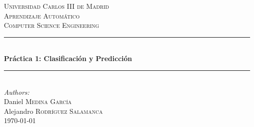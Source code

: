 \documentclass[12pt]{article}
\begin{document}
\begin{titlepage}

\newcommand{\HRule}{\rule{\linewidth}{0.5mm}} %

\center %


\textsc{\LARGE Universidad Carlos III de Madrid}\\[1.5cm] %
\textsc{\Large Aprendizaje Automático}\\[0.5cm] %
\textsc{\large Computer Science Engineering}\\[0.5cm] %


\HRule \\[0.4cm]
{ \huge \bfseries Práctica 1: Clasificación y Predicción}\\[0.4cm] %
\HRule \\[1.5cm]



\emph{Authors:}\\
Daniel \textsc{Medina García}\\ %
Alejandro \textsc{Rodríguez Salamanca}\\[3cm] %


{\large \today}\\[3cm] %




\vfill %

\end{titlepage}
\end{document}
